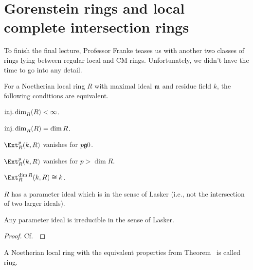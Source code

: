\documentclass[a4paper,parskip=half,numbers=enddot, DIV=12]{scrreprt}
\begin{document}
\section{Gorenstein rings and local complete intersection rings}
To finish the final lecture, Professor Franke teases us with another two classes of rings lying between regular local and CM rings. Unfortunately, we didn't have the time to go into any detail.
\begin{thm}
	For a Noetherian local ring $R$ with maximal ideal $\mathfrak{m}$ and residue field $k$, the following conditions are equivalent.
	\begin{alphanumerate}
		\item $\operatorname{inj.dim}_R(R)<\infty$.
		\item $\operatorname{inj.dim}_R(R)=\dim R$.
		\item $\Ext_R^p(k,R)$ vanishes for $p\gge 0$.
		\item $\Ext_R^p(k,R)$ vanishes for $p>\dim R$.
		\item $\Ext_R^{\dim R}(k,R)\cong k$.
		\item $R$ has a parameter ideal which is  in the sense of Lasker (i.e., not the intersection of two larger ideals).
		\item Any parameter ideal is irreducible in the sense of Lasker.
	\end{alphanumerate}
\end{thm}
\begin{proof}
	Cf.\ \cite[Theorem~18.1]{matsumuraCRT}
\end{proof}
\begin{defi}
	A Noetherian local ring with the equivalent properties from Theorem~ is called  ring.
\end{defi}
\end{document}
